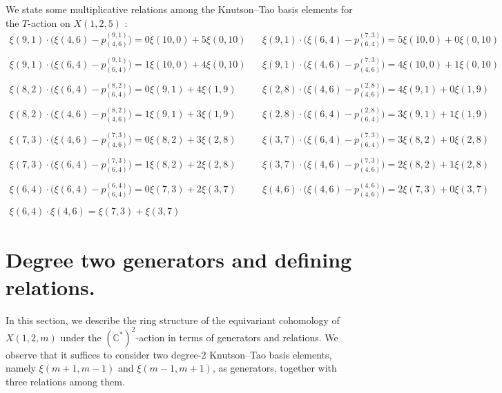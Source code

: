 \documentclass[10pt, a4paper, reqno]{amsart}
\begin{document}
\begin{exam}
We state some multiplicative relations among the Knutson--Tao basis elements  for the $T$-action on $X(1,2,5)$ :
			\[\begin{split}
				\xi(9,1)\cdot\big(\xi(4,6)-p^{(9,1)}_{(4,6)}\big)=0\xi(10,0)+5\xi(0,10) ~~~~	&\xi(9,1)\cdot\big(\xi(6,4)-p^{(7,3)}_{(6,4)}\big)=5\xi(10,0)+0\xi(0,10)\\
				&\\
				\xi(9,1)\cdot\big(\xi(6,4)-p^{(9,1)}_{(6,4)}\big)=1\xi(10,0)+4\xi(0,10) ~~~~	&\xi(9,1)\cdot\big(\xi(4,6)-p^{(7,3)}_{(4,6)}\big)=4\xi(10,0)+1\xi(0,10)\\
				&\\
				\xi(8,2)\cdot\big(\xi(6,4)-p^{(8,2)}_{(6,4)}\big)=0\xi(9,1)+4\xi(1,9) ~~~~~~~	&\xi(2,8)\cdot\big(\xi(4,6)-p^{(2,8)}_{(4,6)}\big)=4\xi(9,1)+0\xi(1,9)\\
				&\\
				\xi(8,2)\cdot\big(\xi(4,6)-p^{(8,2)}_{(4,6)}\big)=1\xi(9,1)+3\xi(1,9) ~~~~~~~	&\xi(2,8)\cdot\big(\xi(6,4)-p^{(2,8)}_{(6,4)}\big)=3\xi(9,1)+1\xi(1,9)\\
				&\\
				\xi(7,3)\cdot\big(\xi(4,6)-p^{(7,3)}_{(4,6)}\big)=0\xi(8,2)+3\xi(2,8) ~~~~~~~	&\xi(3,7)\cdot\big(\xi(6,4)-p^{(7,3)}_{(6,4)}\big)=3\xi(8,2)+0\xi(2,8)\\
				&\\
				\xi(7,3)\cdot\big(\xi(6,4)-p^{(7,3)}_{(6,4)}\big)=1\xi(8,2)+2\xi(2,8) ~~~~~~~	&\xi(3,7)\cdot\big(\xi(4,6)-p^{(7,3)}_{(4,6)}\big)=2\xi(8,2)+1\xi(2,8)\\
					&\\
				\xi(6,4)\cdot\big(\xi(6,4)-p^{(6,4)}_{(6,4)}\big)=0 \xi(7,3)+2\xi(3,7) ~~~~~~~	&\xi(4,6)\cdot\big(\xi(4,6)-p^{(4,6)}_{(4,6)}\big)=2\xi(7,3)+0 \xi(3,7)\\
					&\\
				\xi(6,4)\cdot\xi(4,6)=\xi(7,3)+\xi(3,7)~~~~~~~ &
			\end{split}\] 
\end{exam}











	\section{Degree two generators and defining relations.}\label{s:gen_rel}
In this section, we describe the ring structure of the equivariant cohomology of $X(1,2,m)$ under the $   (\mathbb{C}^*)^2$-action in terms of generators and relations. We observe that it suffices to consider two degree-$2$ Knutson--Tao basis elements, namely $\xi(m+1,m-1)$ and $\xi(m-1,m+1)$, as generators, together with three relations among them.
\end{document}
